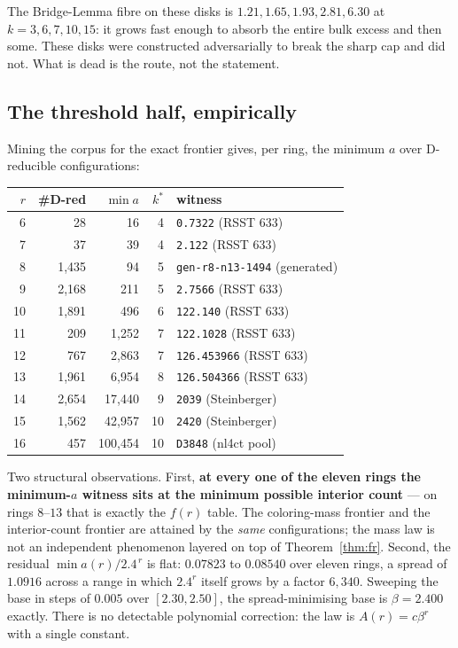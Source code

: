 \documentclass[11pt]{article}
\theoremstyle{definition}
\begin{document}
The Bridge-Lemma fibre on these disks is $1.21, 1.65, 1.93, 2.81, 6.30$ at
$k=3,6,7,10,15$: it grows fast enough to absorb the entire bulk excess and then some.
These disks were constructed adversarially to break the sharp cap and did not. What
is dead is the route, not the statement.

\subsection{The threshold half, empirically}

Mining the corpus for the exact frontier gives, per ring, the minimum $a$ over
D-reducible configurations:

\begin{center}\small
\begin{tabular}{rrrrl}
\toprule
$r$ & \#D-red & $\min a$ & $k^\ast$ & witness \\
\midrule
6  & 28      & 16       & 4  & \texttt{0.7322} (RSST 633) \\
7  & 37      & 39       & 4  & \texttt{2.122} (RSST 633) \\
8  & 1{,}435 & 94       & 5  & \texttt{gen-r8-n13-1494} (generated) \\
9  & 2{,}168 & 211      & 5  & \texttt{2.7566} (RSST 633) \\
10 & 1{,}891 & 496      & 6  & \texttt{122.140} (RSST 633) \\
11 & 209     & 1{,}252  & 7  & \texttt{122.1028} (RSST 633) \\
12 & 767     & 2{,}863  & 7  & \texttt{126.453966} (RSST 633) \\
13 & 1{,}961 & 6{,}954  & 8  & \texttt{126.504366} (RSST 633) \\
14 & 2{,}654 & 17{,}440 & 9  & \texttt{2039} (Steinberger) \\
15 & 1{,}562 & 42{,}957 & 10 & \texttt{2420} (Steinberger) \\
16 & 457     & 100{,}454& 10 & \texttt{D3848} (nl4ct pool) \\
\bottomrule
\end{tabular}
\end{center}

Two structural observations. First, \textbf{at every one of the eleven rings the
minimum-$a$ witness sits at the minimum possible interior count} --- on rings
$8$--$13$ that is exactly the $f(r)$ table. The coloring-mass frontier and the
interior-count frontier are attained by the \emph{same} configurations; the mass law
is not an independent phenomenon layered on top of Theorem~\ref{thm:fr}. Second, the
residual $\min a(r)/2.4^{\,r}$ is flat: $0.07823$ to $0.08540$ over eleven rings, a
spread of $1.0916$ across a range in which $2.4^r$ itself grows by a factor $6{,}340$.
Sweeping the base in steps of $0.005$ over $[2.30,2.50]$, the spread-minimising base
is $\beta = 2.400$ exactly. There is no detectable polynomial correction: the law is
$A(r) = c\beta^r$ with a single constant.
\end{document}
